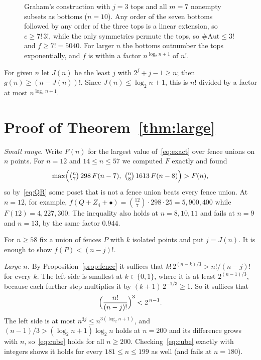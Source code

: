 \documentclass[11pt]{amsart}
\theoremstyle{remark}
\begin{document}
\begin{figure}[ht]
\centering
{}
\caption{Graham's construction with $j=3$ tops and all $m=7$ nonempty subsets as bottoms ($n=10$). Any order of the seven bottoms followed by any order of the three tops is a linear extension, so $e\ge7!\,3!$, while the only symmetries permute the tops, so $\#\mathrm{Aut}\le3!$ and $f\ge7!=5040$. For larger $n$ the bottoms outnumber the tops exponentially, and $f$ is within a factor $n^{\log_2n+1}$ of $n!$.}
\label{fig:graham}
\end{figure}

For given $n$ let $J(n)$ be the least $j$ with $2^j+j-1\ge n$; then $g(n)\ge(n-J(n))!$. Since $J(n)\le\log_2n+1$, this is $n!$ divided by a factor at most $n^{\log_2n+1}$.

\section{Proof of Theorem~\ref{thm:large}}

\emph{Small range.} Write $F(n)$ for the largest value of~\eqref{eq:exact} over fence unions on $n$ points. For $n=12$ and $14\le n\le57$ we computed $F$ exactly and found
\[
\max\Bigl(\tbinom n7\,298\,F(n-7),\ \tbinom n8\,1613\,F(n-8)\Bigr)>F(n),
\]
so by~\eqref{eq:QR} some poset that is not a fence union beats every fence union. At $n=12$, for example, $f(Q+Z_4+\bullet)=\binom{12}7\cdot298\cdot25=5{,}900{,}400$ while $F(12)=4{,}227{,}300$. The inequality also holds at $n=8,10,11$ and fails at $n=9$ and $n=13$, by the same factor $0.944$.

For $n\ge58$ fix a union of fences $P$ with $k$ isolated points and put $j=J(n)$. It is enough to show $f(P)<(n-j)!$.

\emph{Large $n$.} By Proposition~\ref{prop:fence} it suffices that $k!\,2^{(n-k)/3}>n!/(n-j)!$ for every $k$. The left side is smallest at $k\in\{0,1\}$, where it is at least $2^{(n-1)/3}$, because each further step multiplies it by $(k+1)\,2^{-1/3}\ge1$. So it suffices that
\begin{equation}\label{eq:cube}
\Bigl(\frac{n!}{(n-j)!}\Bigr)^3<2^{\,n-1}.
\end{equation}
The left side is at most $n^{3j}\le n^{3(\log_2n+1)}$, and $(n-1)/3>(\log_2n+1)\log_2n$ holds at $n=200$ and its difference grows with $n$, so~\eqref{eq:cube} holds for all $n\ge200$. Checking~\eqref{eq:cube} exactly with integers shows it holds for every $181\le n\le199$ as well (and fails at $n=180$).
\end{document}
